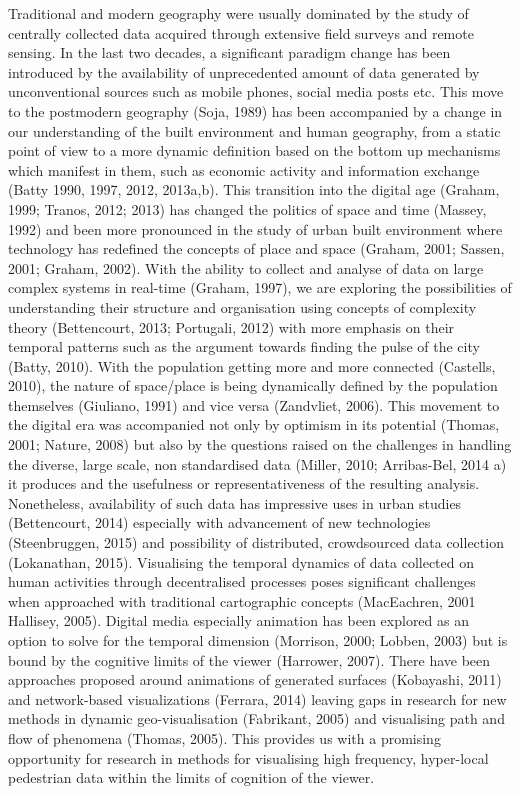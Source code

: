 Traditional and modern geography were usually dominated by the study of centrally collected data acquired through extensive field surveys and remote sensing.
In the last two decades, a significant paradigm change has been introduced by the availability of unprecedented amount of data generated by unconventional sources such as mobile phones, social media posts etc.
This move to the postmodern geography (Soja, 1989) has been accompanied by a change in our understanding of the built environment and human geography, from a static point of view to a more dynamic definition based on the bottom up mechanisms which manifest in them, such as economic activity and information exchange (Batty 1990, 1997, 2012, 2013a,b).
This transition into the digital age (Graham, 1999; Tranos, 2012; 2013) has changed the politics of space and time (Massey, 1992) and been more pronounced in the study of urban built environment where technology has redefined the concepts of place and space (Graham, 2001; Sassen, 2001; Graham, 2002).
With the ability to collect and analyse of data on large complex systems in real-time (Graham, 1997), we are exploring the possibilities of understanding their structure and organisation using concepts of complexity theory (Bettencourt, 2013; Portugali, 2012) with more emphasis on their temporal patterns such as the argument towards finding the pulse of the city (Batty, 2010).
With the population getting more and more connected (Castells, 2010), the nature of space/place is being dynamically defined by the population themselves (Giuliano, 1991) and vice versa (Zandvliet, 2006).
This movement to the digital era was accompanied not only by optimism in its potential (Thomas, 2001; Nature, 2008) but also by the questions raised on the challenges in handling the diverse, large scale, non standardised data (Miller, 2010; Arribas-Bel, 2014 a) it produces and the usefulness or representativeness of the resulting analysis.
Nonetheless, availability of such data has impressive uses in urban studies (Bettencourt, 2014) especially with advancement of new technologies (Steenbruggen, 2015) and possibility of distributed, crowdsourced data collection (Lokanathan, 2015).
Visualising the temporal dynamics of data collected on human activities through decentralised processes poses significant challenges when approached with traditional cartographic concepts (MacEachren, 2001 Hallisey, 2005).
Digital media especially animation has been explored as an option to solve for the temporal dimension (Morrison, 2000; Lobben, 2003) but is bound by the cognitive limits of the viewer (Harrower, 2007).
There have been approaches proposed around animations of generated surfaces (Kobayashi, 2011) and network-based visualizations (Ferrara, 2014) leaving gaps in research for new methods in dynamic geo-visualisation (Fabrikant, 2005) and visualising path and flow of phenomena (Thomas, 2005).
This provides us with a promising opportunity for research in methods for visualising high frequency, hyper-local pedestrian data within the limits of cognition of the viewer.

